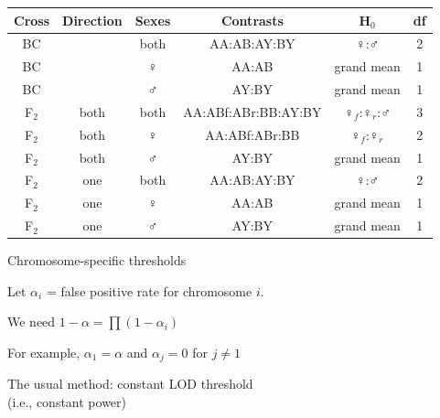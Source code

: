 \documentclass[12pt]{article}
\newcommand{\headsize}{\fontsize{35}{35} \selectfont}
\newcommand{\smallsize}{\fontsize{25}{30} \selectfont}
\begin{document}
\begin{center}
\setlength{\tabcolsep}{12pt}
\renewcommand{\arraystretch}{1.5}
\noindent \begin{tabular}{cccccc} \hline
{\color{myblue} Cross} & {\color{myblue} Direction} & {\color{myblue} Sexes} & {\color{myblue} Contrasts} & {\color{myblue} H$_{\text{0}}$} & {\color{myblue} df} \\ \hline
BC & & both& AA:AB:AY:BY & $\female$:$\male$ & 2
  \\
BC & & $\female$ & AA:AB & grand mean & 1 \\
BC & & $\male$ & AY:BY & grand mean & 1 \\ \hline
F$_{\text{2}}$ & both & both & AA:ABf:ABr:BB:AY:BY & $\female_{f}$:$\female_{r}$:$\male$ & 3 \\
F$_{\text{2}}$ & both & $\female$ & AA:ABf:ABr:BB & $\female_{f}$:$\female_{r}$ & 2
  \\
F$_{\text{2}}$ & both & $\male$ & AY:BY & grand mean & 1 \\
F$_{\text{2}}$ & one  & both & AA:AB:AY:BY & $\female$:$\male$ & 2 \\
F$_{\text{2}}$ & one  & $\female$ & AA:AB & grand mean & 1 \\
F$_{\text{2}}$ & one  & $\male$ & AY:BY & grand mean & 1 \\
\hline
\end{tabular} \end{center}



\newpage

\headsize \color{myyellow}
\hfill Chromosome-specific thresholds

\vspace{2cm}

\color{mywhite} \smallsize

Let {\color{myblue} $\alpha_i$} = false positive rate for chromosome $i$.

\bigskip

We need {\color{myblue} $1 - \alpha = \prod (1 - \alpha_i)$}

\bigskip \bigskip \bigskip

For example,  {\color{myblue} $\alpha_1 = \alpha$ {\color{mywhite} and} $\alpha_j = 0$
  for $j \ne 1$}

\bigskip \bigskip \bigskip

The usual method: {\color{mypink} constant LOD threshold} \\
\hspace*{3in} {\color{myblue} (i.e., constant power)}
\end{document}
